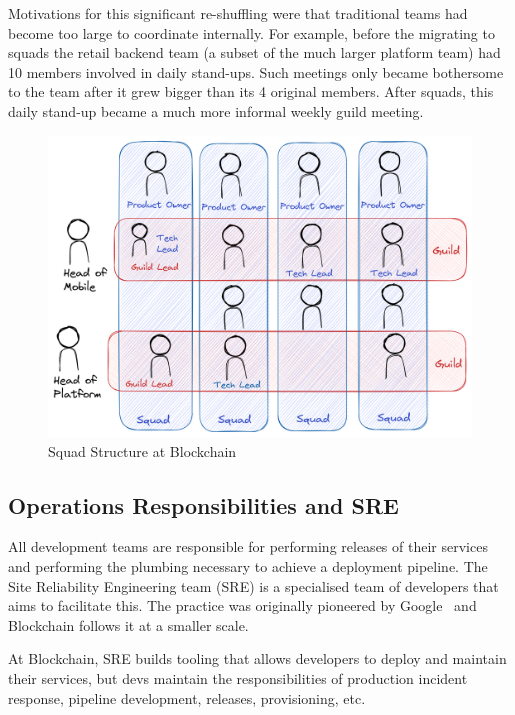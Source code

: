 \documentclass[conference]{IEEEtran}
\begin{document}
    Motivations for this significant re-shuffling were that traditional teams had become too large to coordinate internally.
    For example, before the migrating to squads the retail backend team (a subset of the much larger platform team) had 10 members involved in daily stand-ups.
    Such meetings only became bothersome to the team after it grew bigger than its 4 original members.
    After squads, this daily stand-up became a much more informal weekly guild meeting.


    \begin{figure}[h]
        \centering
        \includegraphics[width=0.9\columnwidth]{bcSquads}
        \caption{Squad Structure at Blockchain}
        \label{fig:squad}
    \end{figure}

    \subsection{Operations Responsibilities and SRE}

    All development teams are responsible for performing releases of their services and performing the plumbing necessary to achieve a deployment pipeline.
    The Site Reliability Engineering team (SRE) is a specialised team of developers that aims to facilitate this.
    The practice was originally pioneered by Google~\cite{googleSreIntro} and Blockchain follows it at a smaller scale.

    At Blockchain, SRE builds tooling that allows developers to deploy and maintain their services, but devs maintain the responsibilities of production incident response, pipeline development, releases, provisioning, etc.
\end{document}
